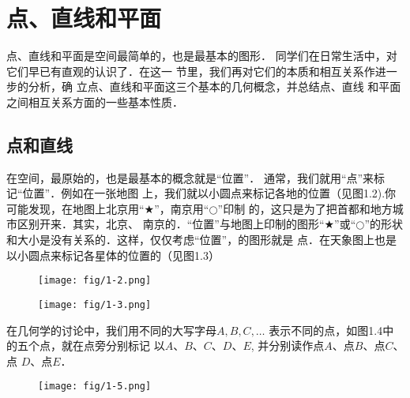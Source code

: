 \section{点、直线和平面}
点、直线和平面是空间最简单的，也是最基本的图形．
同学们在日常生活中，对它们早已有直观的认识了．在这一
节里，我们再对它们的本质和相互关系作进一步的分析，确
立点、直线和平面这三个基本的几何概念，并总结点、直线
和平面之间相互关系方面的一些基本性质．

\subsection{点和直线}
在空间，最原始的，也是最基本的概念就是“位置”．
通常，我们就用“点”来标记“位置”．例如在一张地图
上，我们就以小圆点来标记各地的位置（见图1.2).你
可能发现，在地图上北京用“$\bigstar$”，南京用“$\bigcirc$”印制
的，这只是为了把首都和地方城市区别开来．其实，北京、
南京的．“位置”与地图上印制的图形“$\bigstar$”或“$\bigcirc$”的形状
和大小是没有关系的．这样，仅仅考虑“位置”，的图形就是
点．在天象图上也是以小圆点来标记各星体的位置的（见图1.3）

\begin{figure}[htp]\centering
    \begin{minipage}[t]{0.48\textwidth}
    \centering
\texttt{[image: fig/1-2.png]}
    \caption{}
    \end{minipage}
    \begin{minipage}[t]{0.48\textwidth}
    \centering
	\texttt{[image: fig/1-3.png]}
    \caption{}
    \end{minipage}
    \end{figure}



在几何学的讨论中，我们用不同的大写字母$A,B,C,\ldots$
表示不同的点，如图1.4中的五个点，就在点旁分别标记
以$A$、$B$、$C$、$D$、$E$, 并分别读作点$A$、点$B$、点$C$、点
$D$、点$E$．

\begin{figure}[htp]\centering
    \begin{minipage}[t]{0.48\textwidth}
    \centering
{}
    \caption{}
    \end{minipage}
    \begin{minipage}[t]{0.48\textwidth}
    \centering
      \texttt{[image: fig/1-5.png]}
    \caption{}
    \end{minipage}
    \end{figure}


